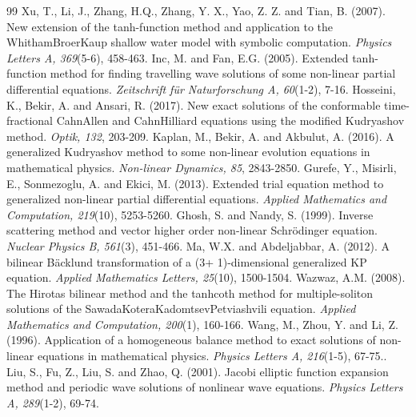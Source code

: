 \documentclass{article}
\numberwithin{equation}{section}
\begin{document}
\begin{thebibliography}{99}
 Xu, T., Li, J., Zhang, H.Q., Zhang, Y. X., Yao, Z. Z. and Tian, B. (2007). New extension of the tanh-function method and application to the WhithamBroerKaup shallow water model with symbolic computation. \emph{Physics Letters A, 369}(5-6), 458-463.
 Inc, M. and Fan, E.G. (2005). Extended tanh-function method for finding travelling wave solutions of some non-linear partial differential equations. \emph{Zeitschrift für Naturforschung A, 60}(1-2), 7-16.
Hosseini, K., Bekir, A. and Ansari, R. (2017). New exact solutions of the conformable time-fractional CahnAllen and CahnHilliard equations using the modified Kudryashov method. \emph{Optik, 132}, 203-209.
 Kaplan, M., Bekir, A. and Akbulut, A. (2016). A generalized Kudryashov method to some non-linear evolution equations in mathematical physics. \emph{Non-linear Dynamics, 85}, 2843-2850.
Gurefe, Y., Misirli, E., Sonmezoglu, A. and Ekici, M. (2013). Extended trial equation method to generalized non-linear partial differential equations. \emph{Applied Mathematics and Computation, 219}(10), 5253-5260.
Ghosh, S. and Nandy, S. (1999). Inverse scattering method and vector higher order non-linear Schrödinger equation. \emph{Nuclear Physics B, 561}(3), 451-466.
Ma, W.X. and Abdeljabbar, A. (2012). A bilinear Bäcklund transformation of a (3+ 1)-dimensional generalized KP equation. \emph{Applied Mathematics Letters, 25}(10), 1500-1504.
Wazwaz, A.M. (2008). The Hirotas bilinear method and the tanhcoth method for multiple-soliton solutions of the SawadaKoteraKadomtsevPetviashvili equation. \emph{Applied Mathematics and Computation, 200}(1), 160-166.
 Wang, M., Zhou, Y. and Li, Z. (1996). Application of a homogeneous balance method to exact solutions of non-linear equations in mathematical physics. \emph{Physics Letters A, 216}(1-5), 67-75..
Liu, S., Fu, Z., Liu, S. and Zhao, Q. (2001). Jacobi elliptic function expansion method and periodic wave solutions of nonlinear wave equations. \emph{Physics Letters A, 289}(1-2), 69-74.
\end{thebibliography}
\end{document}
